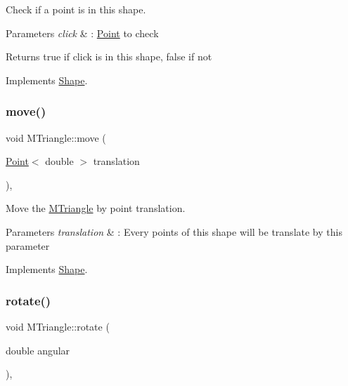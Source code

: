 Check if a point is in this shape. 


\begin{DoxyParams}{Parameters}
{\em click} & \+: \hyperlink{classPoint}{Point} to check \\
\hline
\end{DoxyParams}
\begin{DoxyReturn}{Returns}
true if click is in this shape, false if not 
\end{DoxyReturn}


Implements \hyperlink{classShape_abcce23128cd35989468a88a7194152af}{Shape}.

\mbox{\label{classMTriangle_a1b029feefcf7e3febcdae179557b4c2e}} 
\subsubsection{\texorpdfstring{move()}{move()}}
{\footnotesize\ttfamily void M\+Triangle\+::move (\begin{DoxyParamCaption}\item[{\hyperlink{classPoint}{Point}$<$ double $>$}]{translation }\end{DoxyParamCaption})\hspace{0.3cm}{\ttfamily [override]}, {\ttfamily [virtual]}}



Move the \hyperlink{classMTriangle}{M\+Triangle} by point translation. 


\begin{DoxyParams}{Parameters}
{\em translation} & \+: Every points of this shape will be translate by this parameter \\
\hline
\end{DoxyParams}


Implements \hyperlink{classShape_a52649731b2cb7b67315882d5e005f7e8}{Shape}.

\mbox{\label{classMTriangle_a4be29553eeddf99c367b1ec220bc102b}} 
\subsubsection{\texorpdfstring{rotate()}{rotate()}}
{\footnotesize\ttfamily void M\+Triangle\+::rotate (\begin{DoxyParamCaption}\item[{double}]{angular }\end{DoxyParamCaption})\hspace{0.3cm}{\ttfamily [override]}, {\ttfamily [virtual]}}



